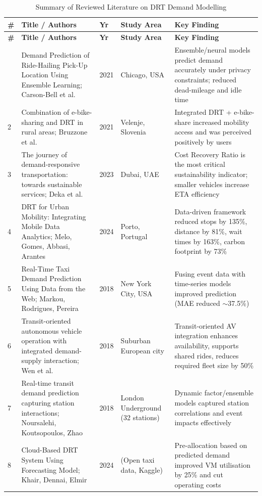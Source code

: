 \documentclass[12pt]{article}
\begin{document}
\small
\begin{longtable}{p{0.4cm}p{4.8cm}p{0.6cm}p{2.7cm}p{4.7cm}}
\caption{Summary of Reviewed Literature on DRT Demand Modelling}
\label{tab:lit-summary} \\
\toprule
\textbf{\#} & \textbf{Title / Authors} & \textbf{Yr} & \textbf{Study Area} & \textbf{Key Finding} \\
\midrule
\endfirsthead
\toprule
\textbf{\#} & \textbf{Title / Authors} & \textbf{Yr} & \textbf{Study Area} & \textbf{Key Finding} \\
\midrule
\endhead
\bottomrule
\endfoot
1 & Demand Prediction of Ride-Hailing Pick-Up Location Using Ensemble Learning; Carson-Bell et al. & 2021 & Chicago, USA & Ensemble/neural models predict demand accurately under privacy constraints; reduced dead-mileage and idle time \\
2 & Combination of e-bike-sharing and DRT in rural areas; Bruzzone et al. & 2021 & Velenje, Slovenia & Integrated DRT + e-bike-share increased mobility access and was perceived positively by users \\
3 & The journey of demand-responsive transportation: towards sustainable services; Deka et al. & 2023 & Dubai, UAE & Cost Recovery Ratio is the most critical sustainability indicator; smaller vehicles increase ETA efficiency \\
4 & DRT for Urban Mobility: Integrating Mobile Data Analytics; Melo, Gomes, Abbasi, Arantes & 2024 & Porto, Portugal & Data-driven framework reduced stops by 135\%, distance by 81\%, wait times by 163\%, carbon footprint by 73\% \\
5 & Real-Time Taxi Demand Prediction Using Data from the Web; Markou, Rodrigues, Pereira & 2018 & New York City, USA & Fusing event data with time-series models improved prediction (MAE reduced $\sim$37.5\%) \\
6 & Transit-oriented autonomous vehicle operation with integrated demand-supply interaction; Wen et al. & 2018 & Suburban European city & Transit-oriented AV integration enhances availability, supports shared rides, reduces required fleet size by 50\% \\
7 & Real-time transit demand prediction capturing station interactions; Noursalehi, Koutsopoulos, Zhao & 2018 & London Underground (32 stations) & Dynamic factor/ensemble models captured station correlations and event impacts effectively \\
8 & Cloud-Based DRT System Using Forecasting Model; Khair, Dennai, Elmir & 2024 & (Open taxi data, Kaggle) & Pre-allocation based on predicted demand improved VM utilisation by 25\% and cut operating costs \\

\end{longtable}
\end{document}
